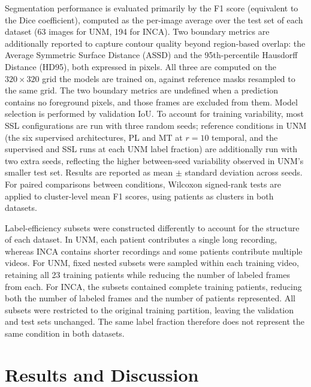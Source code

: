 \documentclass[
  msc,
  american
]{ThesisPUC_v2}
\begin{document}
Segmentation performance is evaluated primarily by the F1 score (equivalent to the Dice coefficient), computed as the per-image average over the test set of each dataset (63 images for UNM, 194 for INCA). Two boundary metrics are additionally reported to capture contour quality beyond region-based overlap: the Average Symmetric Surface Distance (ASSD) and the 95th-percentile Hausdorff Distance (HD95), both expressed in pixels. All three are computed on the $320 \times 320$ grid the models are trained on, against reference masks resampled to the same grid. The two boundary metrics are undefined when a prediction contains no foreground pixels, and those frames are excluded from them. Model selection is performed by validation IoU. To account for training variability, most SSL configurations are run with three random seeds; reference conditions in UNM (the six supervised architectures, PL and MT at $r=10$ temporal, and the supervised and SSL runs at each UNM label fraction) are additionally run with two extra seeds, reflecting the higher between-seed variability observed in UNM's smaller test set. Results are reported as mean $\pm$ standard deviation across seeds. For paired comparisons between conditions, Wilcoxon signed-rank tests are applied to cluster-level mean F1 scores, using patients as clusters in both datasets.

Label-efficiency subsets were constructed differently to account for the structure of each dataset. In UNM, each patient contributes a single long recording, whereas INCA contains shorter recordings and some patients contribute multiple videos. For UNM, fixed nested subsets were sampled within each training video, retaining all 23 training patients while reducing the number of labeled frames from each. For INCA, the subsets contained complete training patients, reducing both the number of labeled frames and the number of patients represented. All subsets were restricted to the original training partition, leaving the validation and test sets unchanged. The same label fraction therefore does not represent the same condition in both datasets.



\chapter{Results and Discussion}
\label{chap:results}
\end{document}
